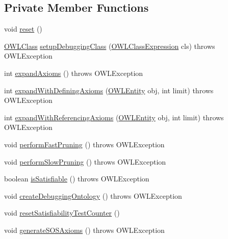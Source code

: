 \subsection*{Private Member Functions}
\begin{DoxyCompactItemize}
\item 
void \hyperlink{classorg_1_1semanticweb_1_1owlapi_1_1debugging_1_1_black_box_o_w_l_debugger_a62f9ed1851d1bd79151a4d8bf6578b82}{reset} ()
\item 
\hyperlink{interfaceorg_1_1semanticweb_1_1owlapi_1_1model_1_1_o_w_l_class}{O\-W\-L\-Class} \hyperlink{classorg_1_1semanticweb_1_1owlapi_1_1debugging_1_1_black_box_o_w_l_debugger_aebd04878d100c667bc3f96b1bd06dcd5}{setup\-Debugging\-Class} (\hyperlink{interfaceorg_1_1semanticweb_1_1owlapi_1_1model_1_1_o_w_l_class_expression}{O\-W\-L\-Class\-Expression} cls)  throws O\-W\-L\-Exception 
\item 
int \hyperlink{classorg_1_1semanticweb_1_1owlapi_1_1debugging_1_1_black_box_o_w_l_debugger_af1b3ee3eab7318a9a61a17dbd9988e99}{expand\-Axioms} ()  throws O\-W\-L\-Exception 
\item 
int \hyperlink{classorg_1_1semanticweb_1_1owlapi_1_1debugging_1_1_black_box_o_w_l_debugger_ad828ca6b793791fba013565262a464fe}{expand\-With\-Defining\-Axioms} (\hyperlink{interfaceorg_1_1semanticweb_1_1owlapi_1_1model_1_1_o_w_l_entity}{O\-W\-L\-Entity} obj, int limit)  throws O\-W\-L\-Exception 
\item 
int \hyperlink{classorg_1_1semanticweb_1_1owlapi_1_1debugging_1_1_black_box_o_w_l_debugger_aba8d4c9065f930a85003d9185075667a}{expand\-With\-Referencing\-Axioms} (\hyperlink{interfaceorg_1_1semanticweb_1_1owlapi_1_1model_1_1_o_w_l_entity}{O\-W\-L\-Entity} obj, int limit)  throws O\-W\-L\-Exception 
\item 
void \hyperlink{classorg_1_1semanticweb_1_1owlapi_1_1debugging_1_1_black_box_o_w_l_debugger_aaf568df207811fa3d449386264e7ad3e}{perform\-Fast\-Pruning} ()  throws O\-W\-L\-Exception 
\item 
void \hyperlink{classorg_1_1semanticweb_1_1owlapi_1_1debugging_1_1_black_box_o_w_l_debugger_a8182fc52896e595f484db3d07a103c13}{perform\-Slow\-Pruning} ()  throws O\-W\-L\-Exception 
\item 
boolean \hyperlink{classorg_1_1semanticweb_1_1owlapi_1_1debugging_1_1_black_box_o_w_l_debugger_a1bdf95369d74cf26376606435c5d2951}{is\-Satisfiable} ()  throws O\-W\-L\-Exception 
\item 
void \hyperlink{classorg_1_1semanticweb_1_1owlapi_1_1debugging_1_1_black_box_o_w_l_debugger_ab8a44780d3c61b9285bb10ec5cfbead1}{create\-Debugging\-Ontology} ()  throws O\-W\-L\-Exception 
\item 
void \hyperlink{classorg_1_1semanticweb_1_1owlapi_1_1debugging_1_1_black_box_o_w_l_debugger_a496f2c082c962ed8dd9880ff2dfbedc6}{reset\-Satisfiability\-Test\-Counter} ()
\item 
void \hyperlink{classorg_1_1semanticweb_1_1owlapi_1_1debugging_1_1_black_box_o_w_l_debugger_a654fd2cc24b81aeda3fe7dfe098d6c83}{generate\-S\-O\-S\-Axioms} ()  throws O\-W\-L\-Exception 
\end{DoxyCompactItemize}
